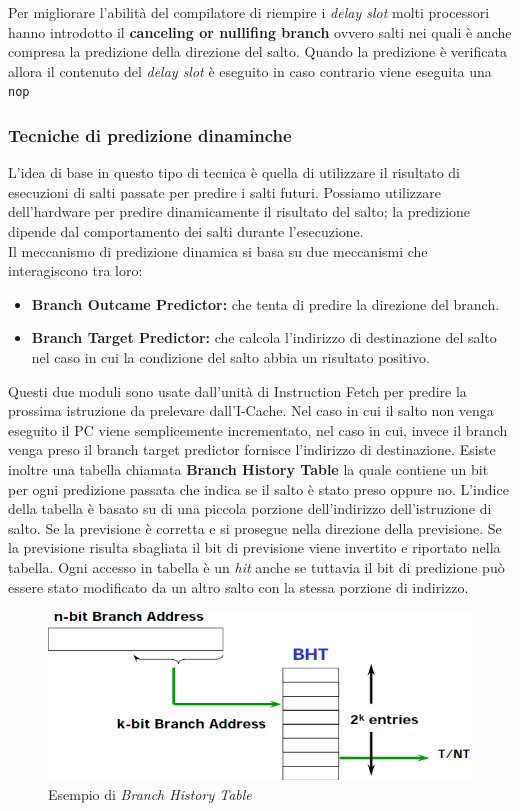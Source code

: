 Per migliorare l'abilità del compilatore di riempire i \emph{delay slot} molti processori hanno introdotto il \textbf{canceling or nullifing branch} ovvero salti nei quali è anche compresa la predizione della direzione del salto. Quando la predizione è verificata allora il contenuto del \emph{delay slot} è eseguito in caso contrario viene eseguita una \texttt{nop}
\subsubsection{Tecniche di predizione dinaminche}
L'idea di base in questo tipo di tecnica è quella di utilizzare il risultato di esecuzioni di salti passate per predire i salti futuri. Possiamo utilizzare dell'hardware per predire dinamicamente il risultato del salto; la predizione dipende dal comportamento dei salti durante l'esecuzione.\\
Il meccanismo di predizione dinamica si basa su due meccanismi che interagiscono tra loro:
\begin{itemize}
\item \textbf{Branch Outcame Predictor:} che tenta di predire la direzione del branch.
\item \textbf{Branch Target Predictor:} che calcola l'indirizzo di destinazione del salto nel caso in cui la condizione del salto abbia un risultato positivo.
\end{itemize}
Questi due moduli sono usate dall'unità di Instruction Fetch per predire la prossima istruzione da prelevare dall'I-Cache. Nel caso in cui il salto non venga eseguito il PC viene semplicemente incrementato, nel caso in cui, invece il branch venga preso il branch target predictor fornisce l'indirizzo di destinazione. Esiste inoltre una tabella chiamata \textbf{Branch History Table}  la quale contiene un bit per ogni predizione passata che indica se il salto è stato preso oppure no. L'indice della tabella è basato su di una piccola porzione dell'indirizzo dell'istruzione di salto. Se la previsione è corretta e si prosegue nella direzione della previsione. Se la previsione risulta sbagliata il bit di previsione viene invertito e riportato nella tabella. Ogni accesso in tabella è un \emph{hit} anche se tuttavia il bit di predizione può essere stato modificato da un altro salto con la stessa porzione di indirizzo.
\begin{figure}[htb]
\centering
\includegraphics[scale=0.5]{img/historytable.png}
\caption{Esempio di \emph{Branch History Table}}\label{fig:historytable}
\end{figure}
